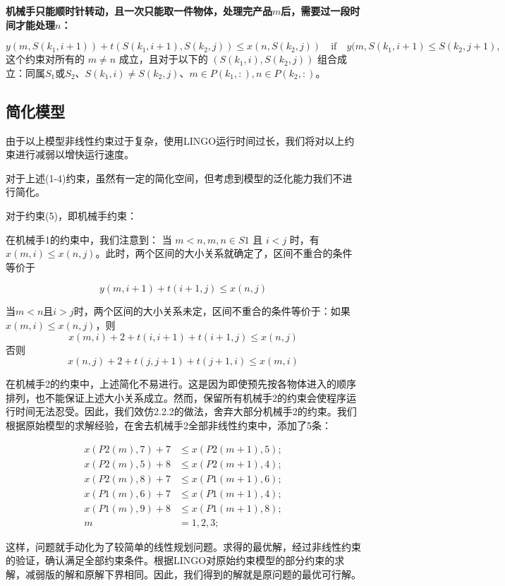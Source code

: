 \documentclass{ctexart}
\begin{document}
{{{    		 \textbf{机械手只能顺时针转动，且一次只能取一件物体，处理完产品$m$后，需要过一段时间才能处理$n$：}
    		 
			 $$y(m, S(k_1,i+1))+ t(S(k_1,i+1), S(k_2,j)) \leq x(n, S(k_2,j)) \quad \mathrm{if} \quad y(m, S(k_1,i+1) \leq S(k_2,j+1),$$ 这个约束对所有的 $m \neq n$ 成立，且对于以下的 $(S(k_1,i), S(k_2,j))$ 组合成立：同属$S_1$或$S_2$、$S(k_1,i)\neq S(k_2,j)$、$m\in P(k_1,:), n\in P(k_2,:)$。
    	}
    }

    \subsection{简化模型}
    {
		由于以上模型非线性约束过于复杂，使用LINGO运行时间过长，我们将对以上约束进行减弱以增快运行速度。
		
		对于上述(1-4)约束，虽然有一定的简化空间，但考虑到模型的泛化能力我们不进行简化。
		
		对于约束(5)，即机械手约束：

		在机械手1的约束中，我们注意到：
		当 $m<n, m, n\in S1$ 且 $i<j$ 时，有 $x(m, i) \leq x(n, j)$。此时，两个区间的大小关系就确定了，区间不重合的条件等价于
		
		$$
		y(m, i+1) + t(i+1, j) \leq x(n, j)
		$$
		
		当$m<n$且$i>j$时，两个区间的大小关系未定，区间不重合的条件等价于：如果$x(m, i) \leq x(n, j)$，则
		$$x(m, i) + 2 + t(i, i+1) + t(i+1, j) \leq x(n, j)$$ 否则
		$$x(n, j) + 2 + t(j, j+1) + t(j+1, i) \leq x(m, i)$$
		
		在机械手2的约束中，上述简化不易进行。这是因为即使预先按各物体进入的顺序排列，也不能保证上述大小关系成立。然而，保留所有机械手2的约束会使程序运行时间无法忍受。因此，我们效仿2.2.2的做法，舍弃大部分机械手2的约束。我们根据原始模型的求解经验，在舍去机械手2全部非线性约束中，添加了5条：
		
		$$
		\begin{aligned}
		x(P2(m), 7) + 7 &\le x(P2(m+1), 5);\\
		x(P2(m), 5) + 8 &\le x(P2(m+1), 4);\\
		x(P2(m), 8) + 7 &\le x(P1(m+1), 6);\\
		x(P1(m), 6) + 7 &\le x(P1(m+1), 4);\\
		x(P1(m), 9) + 8 &\le x(P1(m+1), 8);\\
		m&=1,2,3;
		\end{aligned}
		$$
		
		这样，问题就手动化为了较简单的线性规划问题。求得的最优解，经过非线性约束的验证，确认满足全部约束条件。根据LINGO对原始约束模型的部分约束的求解，减弱版的解和原解下界相同。因此，我们得到的解就是原问题的最优可行解。
        
}}
\end{document}
